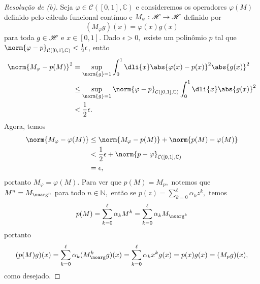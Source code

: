 \begin{proof}[Resolução de (b)]
  Seja \(\varphi \in \mathcal{C}([0,1], \mathbb{C})\) e consideremos os operadores \(\varphi(M)\) definido pelo cálculo funcional contínuo e \(M_\varphi : \mathscr{H} \to \mathscr{H}\) definido por
  \begin{equation*}
    (M_\varphi g)(x) = \varphi(x)g(x)
  \end{equation*}
  para toda \(g \in \mathscr{H}\) e \(x \in [0,1].\) Dado \(\epsilon > 0,\) existe um polinômio \(p\) tal que \(\norm{\varphi - p}_{\mathcal{C}([0,1],\mathbb{C})} < \frac12\epsilon\), então
  \begin{align*}
    \norm{M_\varphi - p(M)}^2 &= \sup_{\norm{g} = 1} \int_0^1 \dli{x} \abs{\varphi(x) - p(x)}^2\abs{g(x)}^2\\
                              &\leq \sup_{\norm{g} = 1} \norm{\varphi - p}_{\mathcal{C}([0,1],\mathbb{C})} \int_0^1 \dli{x} \abs{g(x)}^2\\
                              &< \frac12\epsilon.
  \end{align*}
  Agora, temos
  \begin{align*}
    \norm{M_\varphi - \varphi(M)} &\leq \norm{M_\varphi - p(M)} + \norm{p(M) - \varphi(M)}\\
                                  &< \frac12 \epsilon + \norm{p - \varphi}_{\mathcal{C}([0,1],\mathbb{C})}\\
                                  &= \epsilon,
  \end{align*}
  portanto \(M_\varphi = \varphi(M).\) Para ver que \(p(M) = M_p,\) notemos que \(M^n = M_{\noarg^n}\) para todo \(n \in \mathbb{N},\) então se \(p(z) = \sum_{k = 0}^\ell \alpha_k z^k,\) temos
  \begin{equation*}
    p(M) = \sum_{k = 0}^\ell \alpha_k M^k = \sum_{k = 0}^\ell \alpha_k M_{\noarg^k}
  \end{equation*}
  portanto
  \begin{equation*}
    (p(M)g)(x) = \sum_{k = 0}^\ell \alpha_k (M_{\noarg}^kg)(x) = \sum_{k = 0}^\ell \alpha_k x^k g(x) = p(x)g(x) = (M_{p}g)(x),
  \end{equation*}
  como desejado.
\end{proof}
